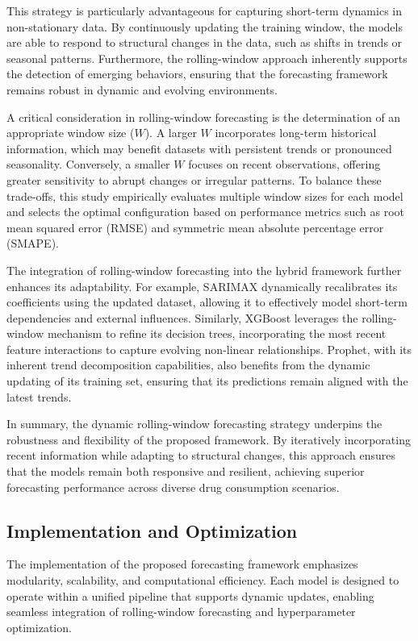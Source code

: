 \documentclass[journal]{IEEEtran}
\begin{document}
This strategy is particularly advantageous for capturing short-term dynamics in non-stationary data. By continuously updating the training window, the models are able to respond to structural changes in the data, such as shifts in trends or seasonal patterns. Furthermore, the rolling-window approach inherently supports the detection of emerging behaviors, ensuring that the forecasting framework remains robust in dynamic and evolving environments.

A critical consideration in rolling-window forecasting is the determination of an appropriate window size (\(W\)). A larger \(W\) incorporates long-term historical information, which may benefit datasets with persistent trends or pronounced seasonality. Conversely, a smaller \(W\) focuses on recent observations, offering greater sensitivity to abrupt changes or irregular patterns. To balance these trade-offs, this study empirically evaluates multiple window sizes for each model and selects the optimal configuration based on performance metrics such as root mean squared error (RMSE) and symmetric mean absolute percentage error (SMAPE).

The integration of rolling-window forecasting into the hybrid framework further enhances its adaptability. For example, SARIMAX dynamically recalibrates its coefficients using the updated dataset, allowing it to effectively model short-term dependencies and external influences. Similarly, XGBoost leverages the rolling-window mechanism to refine its decision trees, incorporating the most recent feature interactions to capture evolving non-linear relationships. Prophet, with its inherent trend decomposition capabilities, also benefits from the dynamic updating of its training set, ensuring that its predictions remain aligned with the latest trends.

In summary, the dynamic rolling-window forecasting strategy underpins the robustness and flexibility of the proposed framework. By iteratively incorporating recent information while adapting to structural changes, this approach ensures that the models remain both responsive and resilient, achieving superior forecasting performance across diverse drug consumption scenarios.

\subsection{Implementation and Optimization}

The implementation of the proposed forecasting framework emphasizes modularity, scalability, and computational efficiency. Each model is designed to operate within a unified pipeline that supports dynamic updates, enabling seamless integration of rolling-window forecasting and hyperparameter optimization.
\end{document}
